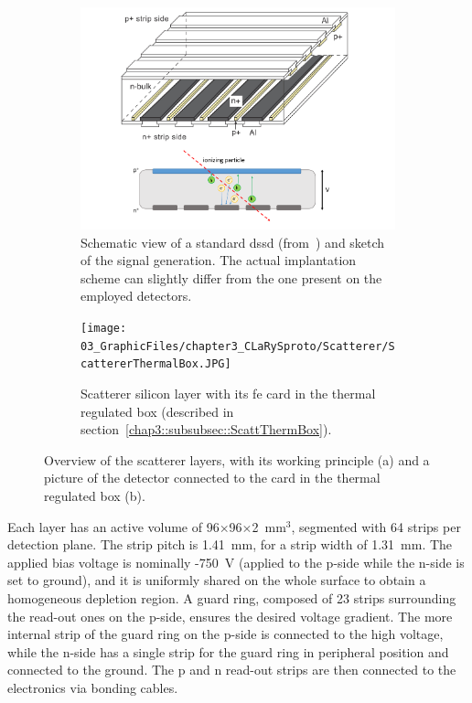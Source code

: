 \begin{figure}
\begin{subfigure}[t]{.5\textwidth}
\centering
\includegraphics[width=1\textwidth]{03_GraphicFiles/chapter3_CLaRySproto/Scatterer/DSSD_theory_1.pdf}
\caption{Schematic view of a standard \gls{dssd} (from~\cite{Takeda2008}) and sketch of the signal generation. The actual implantation scheme can slightly differ from the one present on the employed detectors.}
\label{chap3::fig::dssdTHEO}
\end{subfigure}
\begin{subfigure}[t]{.5\textwidth}
\centering
\texttt{[image: 03\_GraphicFiles/chapter3\_CLaRySproto/Scatterer/ScattererThermalBox.JPG]}
\caption{Scatterer silicon layer with its \gls{fe} card in the thermal regulated box (described in section~\ref{chap3::subsubsec::ScattThermBox}).}
\label{chap3::fig::ScattPicture}
\end{subfigure}
\caption{Overview of the scatterer layers, with its working principle (a) and a picture of the detector connected to the  card in the thermal regulated box (b).}
\label{chap3::fig::scatterer}
\end{figure} 

Each layer has an active volume of 96$\times$96$\times$2~mm$^{3}$, segmented with 64 strips per detection plane. The strip pitch is 1.41~mm, for a strip width of 1.31~mm. The applied bias voltage is nominally -750~V (applied to the p-side while the n-side is set to ground), and it is uniformly shared on the whole surface to obtain a homogeneous depletion region. A guard ring, composed of 23 strips surrounding the read-out ones on the p-side, ensures the desired voltage gradient. The more internal strip of the guard ring on the p-side is connected to the high voltage, while the n-side has a single strip for the guard ring in peripheral position and connected to the ground. The p and n read-out strips are then connected to the  electronics via bonding cables.

